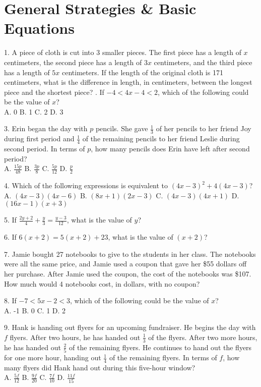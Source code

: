\documentclass[../satmath.tex]{subfiles}
\begin{document}
\chapter{General Strategies \& Basic Equations}
1. A piece of cloth is cut into 3 smaller pieces. The first piece has a length of $x$ centimeters, the second piece has a length of $3x$
centimeters, and the third piece has a length of $5x$ centimeters. If the length of the original cloth is 171 centimeters, what is the difference 
in length, in centimeters, between the longest piece and the shortest piece?
. If $-4<4x-4<2$, which of the following could be the value of $x$?\\
A. 0 \quad B. 1 \quad C. 2 \quad D. 3
\medbreak

3. Erin began the day with $p$ pencils. She gave $\frac{1}{3}$ of her pencils to her friend Joy during first period and $\frac{1}{4}$ of the remaining 
pencils to her friend Leslie during second period. In terms of $p$, how many pencils does Erin have left after second period?\\
A. $\frac{15p}{48}$ \quad B. $\frac{3p}{8}$ \quad C. $\frac{5p}{12}$ \quad D. $\frac{p}{2}$
\medbreak

4. Which of the following expressions is equivalent to $(4x-3)^2+4(4x-3)$?\\
A. $(4x-3)(4x-6)$ \quad B. $(8x+1)(2x-3)$ \quad C. $(4x-3)(4x+1)$ \quad D. $(16x-1)(x+3)$
\medbreak

5. If $\frac{2y+2}{4}+\frac{y}{3}=\frac{y-3}{12}$, what is the value of $y$?
\medbreak

6. If $6(x+2)=5(x+2)+23$, what is the value of $(x+2)$?
\medbreak

7. Jamie bought 27 notebooks to give to the students in her class. The notebooks were all the same price, and Jamie used a coupon that gave her 
\$55 dollars off her purchase. After Jamie used the coupon, the cost of the notebooks was \$107. How much would 4 notebooks cost, in dollars, with no coupon?
\medbreak

8. If $-7<5x-2<3$, which of the following could be the value of $x$?\\
A. -1 \quad B. 0 \quad C. 1 \quad D. 2
\medbreak

9. Hank is handing out flyers for an upcoming fundraiser. He begins the day with $f$ flyers. After two hours, he has handed out $\frac{1}{3}$ of the flyers. After two more hours, he has handed 
out $\frac{2}{5}$ of the remaining flyers. He continues to hand out the flyers for one more hour, handing out $\frac{1}{4}$ of the remaining flyers.
In terms of $f$, how many flyers did Hank hand out during this five-hour window?\\
A. $\frac{5f}{12}$ \quad B. $\frac{9f}{20}$ \quad C. $\frac{7f}{10}$ \quad D. $\frac{11f}{15}$
\medbreak
\end{document}
